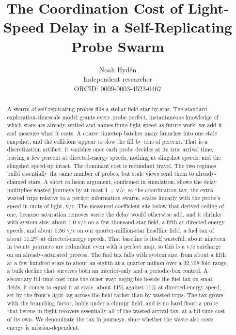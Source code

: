 \documentclass[11pt]{article}
\title{The Coordination Cost of Light-Speed Delay in a Self-Replicating Probe Swarm}
\author{Noah Hyd\'en\\[2pt]
  \normalsize Independent researcher\\
  \normalsize ORCID: 0009-0003-4523-0467}
\date{}
\begin{document}
\maketitle


\begin{abstract}
A swarm of self-replicating probes fills a stellar field star by star. The standard
exploration-timescale model grants every probe perfect, instantaneous knowledge of which stars are
already settled and names finite light-speed as future work; we add it and measure what it costs.
A coarse timestep batches many launches into one stale snapshot, and the collisions appear to slow
the fill by tens of percent. That is a discretization artifact: it vanishes once each probe decides
at its true arrival time, leaving a few percent at directed-energy speeds, nothing at slingshot
speeds, and the slingshot speed-up intact. The dominant cost is redundant travel. The two regimes
build essentially the same number of probes, but stale views send them to already-claimed stars. A
short collision argument, confirmed in simulation, shows the delay multiplies wasted journeys by at
most 1 + v/c, so the coordination tax, the extra wasted trips relative to a perfect-information
swarm, scales linearly with the probe's speed in units of light, v/c. The measured coefficient sits
below that derived ceiling of one, because saturation removes waste the delay would otherwise add,
and it shrinks with system size: about 1.0 v/c on a few-thousand-star field, a fifth at
directed-energy speeds, and about 0.56 v/c on our quarter-million-star headline field, a fuel
tax of about 11.2\% at directed-energy speeds. That baseline is itself wasteful: about nineteen in twenty
journeys are redundant even with a perfect map, so this is a v/c surcharge on an already-saturated
process. The fuel tax falls with system size, from about a fifth at a few hundred stars to about an eighth
at a quarter million over a 32{,}768-fold range, a bulk decline that survives both an
interior-only and a periodic-box control. A secondary fill-time cost runs the other way: negligible
beside the fuel tax on small fields, it comes to equal it at scale, about 11\% against 11\% at
directed-energy speed, set by the front's light-lag across the field rather than by wasted trips.
The tax grows with the branching factor, holds under a clumpy field, and is no hard floor: a probe
that listens in flight recovers essentially all of the wasted-arrival tax, at a fill-time cost of
its own. We denominate the tax in journeys, since whether the waste also costs energy is
mission-dependent.
\end{abstract}
\end{document}
